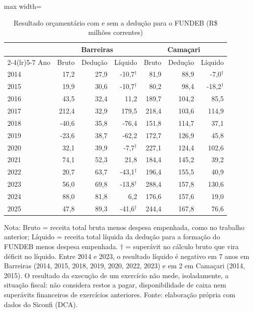 \begin{table}[H]
\centering\footnotesize
\setlength{\tabcolsep}{4pt}
\caption{Resultado orçamentário com e sem a dedução para o FUNDEB (R\$ milhões correntes)}
\label{tab:resultado}
\begin{adjustbox}{max width=\textwidth}
\begin{tabular}{lrrrrrr}
\toprule
 & \multicolumn{3}{c}{Barreiras} & \multicolumn{3}{c}{Camaçari} \\
\cmidrule(lr){2-4}\cmidrule(lr){5-7}
Ano & Bruto & Dedução & Líquido & Bruto & Dedução & Líquido \\
\midrule
2014 & 17,2 & 27,9 & -10,7$^{\dagger}$ & 81,9 & 88,9 & -7,0$^{\dagger}$ \\
2015 & 19,9 & 30,6 & -10,7$^{\dagger}$ & 80,2 & 98,4 & -18,2$^{\dagger}$ \\
2016 & 43,5 & 32,4 & 11,2 & 189,7 & 104,2 & 85,5 \\
2017 & 212,4 & 32,9 & 179,5 & 218,4 & 103,6 & 114,9 \\
2018 & -40,6 & 35,8 & -76,4 & 151,8 & 114,7 & 37,1 \\
2019 & -23,6 & 38,7 & -62,2 & 172,7 & 126,9 & 45,8 \\
2020 & 32,1 & 39,9 & -7,7$^{\dagger}$ & 227,1 & 124,4 & 102,6 \\
2021 & 74,1 & 52,3 & 21,8 & 184,4 & 145,2 & 39,2 \\
2022 & 20,7 & 63,7 & -43,1$^{\dagger}$ & 196,4 & 155,5 & 40,9 \\
2023 & 56,0 & 69,8 & -13,8$^{\dagger}$ & 288,4 & 157,8 & 130,6 \\
2024 & 88,0 & 81,8 & 6,2 & 176,6 & 157,6 & 19,0 \\
2025 & 47,8 & 89,3 & -41,6$^{\dagger}$ & 244,4 & 167,8 & 76,6 \\
\bottomrule
\end{tabular}
\end{adjustbox}
\par\vspace{3pt}\parbox{\textwidth}{\scriptsize Nota: Bruto = receita total bruta menos despesa empenhada, como no trabalho anterior; Líquido = receita total líquida da dedução para a formação do FUNDEB menos despesa empenhada. $\dagger$ = superávit no cálculo bruto que vira déficit no líquido. Entre 2014 e 2023, o resultado líquido é negativo em 7 anos em Barreiras (2014, 2015, 2018, 2019, 2020, 2022, 2023) e em 2 em Camaçari (2014, 2015). O resultado da execução de um exercício não mede, isoladamente, a situação fiscal: não considera restos a pagar, disponibilidade de caixa nem superávits financeiros de exercícios anteriores. Fonte: elaboração própria com dados do Siconfi (DCA).}
\end{table}
